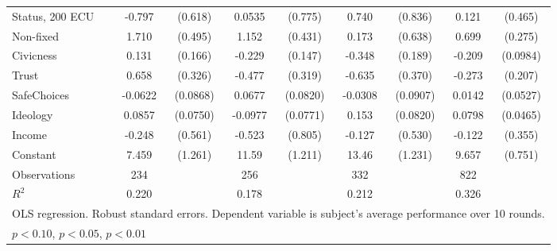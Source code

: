 {\begin{tabular}{l*{4}{cc}}
Status, 200 ECU &   -0.797         &  (0.618)&   0.0535         &  (0.775)&    0.740         &  (0.836)&    0.121         &  (0.465)\\
Non-fixed       &    1.710\sym{***}&  (0.495)&    1.152\sym{***}&  (0.431)&    0.173         &  (0.638)&    0.699\sym{**} &  (0.275)\\
Civicness       &    0.131         &  (0.166)&   -0.229         &  (0.147)&   -0.348\sym{*}  &  (0.189)&   -0.209\sym{**} & (0.0984)\\
Trust           &    0.658\sym{**} &  (0.326)&   -0.477         &  (0.319)&   -0.635\sym{*}  &  (0.370)&   -0.273         &  (0.207)\\
SafeChoices     &  -0.0622         & (0.0868)&   0.0677         & (0.0820)&  -0.0308         & (0.0907)&   0.0142         & (0.0527)\\
Ideology        &   0.0857         & (0.0750)&  -0.0977         & (0.0771)&    0.153\sym{*}  & (0.0820)&   0.0798\sym{*}  & (0.0465)\\
Income          &   -0.248         &  (0.561)&   -0.523         &  (0.805)&   -0.127         &  (0.530)&   -0.122         &  (0.355)\\
Constant        &    7.459\sym{***}&  (1.261)&    11.59\sym{***}&  (1.211)&    13.46\sym{***}&  (1.231)&    9.657\sym{***}&  (0.751)\\
\hline
Observations    &      234         &         &      256         &         &      332         &         &      822         &         \\
\(R^{2}\)       &    0.220         &         &    0.178         &         &    0.212         &         &    0.326         &         \\
\hline\hline
\multicolumn{9}{l}{\footnotesize OLS regression. Robust standard errors. Dependent variable is subject's average performance over 10 rounds.}\\
\multicolumn{9}{l}{\footnotesize \sym{*} \(p<0.10\), \sym{**} \(p<0.05\), \sym{***} \(p<0.01\)}\\
\end{tabular}
}
